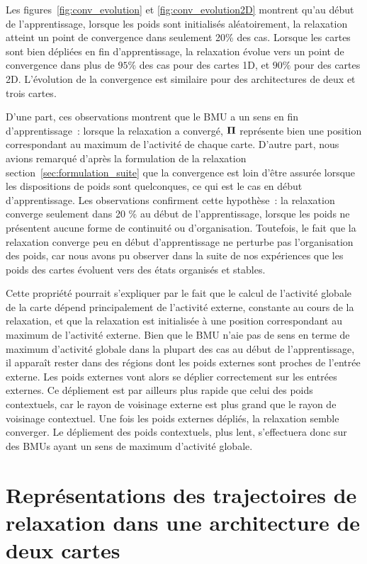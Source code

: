 \documentclass[../main]{subfiles}
\begin{document}
Les figures~\ref{fig:conv_evolution} et \ref{fig:conv_evolution2D} montrent qu'au début de l'apprentissage, lorsque les poids sont initialisés aléatoirement, la relaxation atteint un point de convergence dans seulement 20\% des cas. Lorsque les cartes sont bien dépliées en fin d'apprentissage, la relaxation évolue vers un point de convergence dans plus de $95\%$ des cas pour des cartes 1D, et $90\%$ pour des cartes 2D. L'évolution de la convergence est similaire pour des architectures de deux et trois cartes.

D'une part, ces observations montrent que le BMU a un sens en fin d'apprentissage~: lorsque la relaxation a convergé, $\mathbf{\Pi}$ représente bien une position correspondant au maximum de l'activité de chaque carte.
D'autre part, nous avions remarqué d'après la formulation de la relaxation section~\ref{sec:formulation_suite} que la convergence est loin d'être assurée lorsque les dispositions de poids sont quelconques, ce qui est  le cas en début d'apprentissage. 
Les observations confirment cette hypothèse~: la relaxation converge seulement dans 20 \% au début de l'apprentissage, lorsque les poids ne présentent aucune forme de continuité ou d'organisation.
Toutefois, le fait que la relaxation converge peu en début d'apprentissage ne perturbe pas l'organisation des poids, car nous avons pu observer dans la suite de nos expériences que les poids des cartes évoluent vers des états organisés et stables.

Cette propriété pourrait s'expliquer par le fait que le calcul de l'activité globale de la carte dépend principalement de l'activité externe, constante au cours de la relaxation, et que la relaxation est initialisée à une position correspondant au maximum de l'activité externe.
Bien que le BMU n'aie pas de sens en terme de maximum d'activité globale dans la plupart des cas au début de l'apprentissage, il apparaît rester dans des régions dont les poids externes sont proches de l'entrée externe.
Les poids externes vont alors se déplier correctement sur les entrées externes. Ce dépliement est par ailleurs plus rapide que celui des poids contextuels, car le rayon de voisinage externe est plus grand que le rayon de voisinage contextuel.
Une fois les poids externes dépliés, la relaxation semble converger. Le dépliement des poids contextuels, plus lent, s'effectuera donc sur des BMUs ayant un sens de maximum d'activité globale.

\section{Représentations des trajectoires de relaxation dans une architecture de deux cartes}
\end{document}
